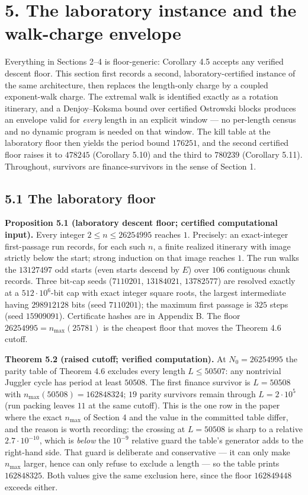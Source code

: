 \documentclass[12pt]{article}
\begin{document}
\section{5. The laboratory instance and the walk-charge
envelope}\label{the-laboratory-instance-and-the-walk-charge-envelope}

Everything in Sections 2--4 is floor-generic: Corollary 4.5 accepts any
verified descent floor. This section first records a second,
laboratory-certified instance of the same architecture, then replaces
the length-only charge by a coupled exponent-walk charge. The extremal
walk is identified exactly as a rotation itinerary, and a Denjoy--Koksma
bound over certified Ostrowski blocks produces an envelope valid for
\emph{every} length in an explicit window --- no per-length census and
no dynamic program is needed on that window. The kill table at the
laboratory floor then yields the period bound \(176251\), and the second
certified floor raises it to \(478245\) (Corollary 5.10) and the third
to \(780239\) (Corollary 5.11). Throughout, survivors are
finance-survivors in the sense of Section 1.

\subsection{5.1 The laboratory floor}\label{the-laboratory-floor}

\textbf{Proposition 5.1 (laboratory descent floor; certified
computational input).} Every integer \(2\le n\le 26254995\) reaches
\(1\). Precisely: an exact-integer first-passage run records, for each
such \(n\), a finite realized itinerary with image strictly below the
start; strong induction on that image reaches \(1\). The run walks the
\(13127497\) odd starts (even starts descend by \(E\)) over \(106\)
contiguous chunk records. Three bit-cap seeds (\(7110201\),
\(13184021\), \(13782577\)) are resolved exactly at a
\(512\cdot 10^6\)-bit cap with exact integer square roots, the largest
intermediate having \(298912128\) bits (seed \(7110201\)); the maximum
first passage is \(325\) steps (seed \(15909091\)). Certificate hashes
are in Appendix B. The floor \(26254995=n_{\max}(25781)\) is the
cheapest floor that moves the Theorem 4.6 cutoff.

\textbf{Theorem 5.2 (raised cutoff; verified computation).} At
\(N_0=26254995\) the parity table of Theorem 4.6 excludes every length
\(L\le 50507\): any nontrivial Juggler cycle has period at least
\(50508\). The first finance survivor is \(L=50508\) with
\(n_{\max}(50508)=162848324\); \(19\) parity survivors remain through
\(L=2\cdot 10^5\) (run packing leaves \(11\) at the same cutoff). This
is the one row in the paper where the exact \(n_{\max}\) of Section 4
and the value in the committed table differ, and the reason is worth
recording: the crossing at \(L=50508\) is sharp to a relative
\(2.7\cdot10^{-10}\), which is \emph{below} the \(10^{-9}\) relative
guard the table's generator adds to the right-hand side. That guard is
deliberate and conservative --- it can only make \(n_{\max}\) larger,
hence can only refuse to exclude a length --- so the table prints
\(162848325\). Both values give the same exclusion here, since the floor
\(162849448\) exceeds either.
\end{document}
